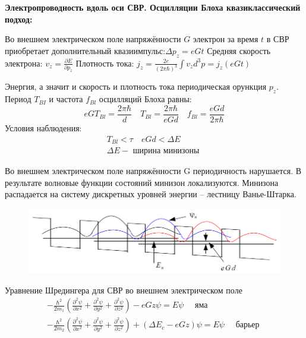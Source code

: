 \textbf{Электропроводность вдоль оси СВР. Осцилляции Блоха квазиклассический подход:}

Во внешнем электрическом поле напряжённости $G$ электрон за время $t$ в СВР приобретает дополнительный квазиимпульс:$\Delta p_z=e G t $
Средняя скорость электрона: $v_z=\frac{\partial E}{\partial p_z}$
Плотность тока: $j_z=\frac{2 e}{(2 \pi \hbar)^3} \int v_z d^3 p=j_z(e G t)$

Энергия, а значит и скорость и плотность тока периодическая орункция $p_z$. Период $T_{B I}$ и частота $f_{B l}$ осцилляций Блоха равны:
$$
e G T_{B l}=\frac{2 \pi \hbar}{d} \quad T_{B l}=\frac{2 \pi \hbar}{e G d} \quad f_{B l}=\frac{e G d}{2 \pi \hbar}
$$
Условия наблюдения:
$$
\begin{gathered}
T_{B l}<\tau \quad e G d<\Delta E \\
\Delta E-\text { ширина минизоны }
\end{gathered}
$$


Во внешнем электрическом поле напряжённости G периодичность
нарушается. В результате волновые функции состояний минизон
локализуются. Минизона распадается на систему дискретных уровней
энергии – лестницу Ванье-Штарка.
\begin{figure}[h!]
\centering
 \includegraphics[width=\textwidth]{images/ph30.8.png}
\end{figure}

Уравнение Шредингера для СВР во внешнем электрическом поле
$$
\begin{gathered}
-\frac{\hbar^2}{2 m_1}\left(\frac{\partial^2 \psi}{\partial x^2}+\frac{\partial^2 \psi}{\partial y^2}+\frac{\partial^2 \psi}{\partial z^2}\right)-e G z \psi=E \psi \quad \text { яма } \\
-\frac{\hbar^2}{2 m_2}\left(\frac{\partial^2 \psi}{\partial x^2}+\frac{\partial^2 \psi}{\partial y^2}+\frac{\partial^2 \psi}{\partial z^2}\right)+\left(\Delta E_c-e G z\right) \psi=E \psi \quad \text { барьер }
\end{gathered}
$$


